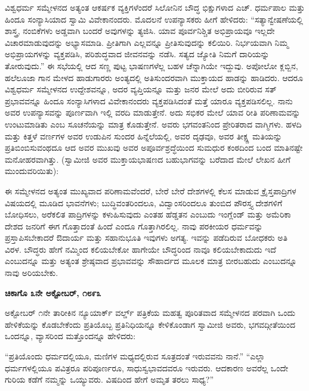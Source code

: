 ವಿಶ್ವಧರ್ಮ ಸಮ್ಮೇಳನದ ಅತ್ಯಂತ ಆಕರ್ಷಕ ವ್ಯಕ್ತಿಗಳೆಂದರೆ ಸಿಲೋನಿನ ಬೌದ್ಧ ಭಿಕ್ಷು\break ಗಳಾದ ಎಚ್​. ಧರ್ಮಪಾಲ ಮತ್ತು ಹಿಂದೂ ಸಂನ್ಯಾಸಿಯಾದ ಸ್ವಾಮಿ ವಿವೇಕಾನಂದರು. ಮೊದಲನೆ ಉಪನ್ಯಾಸಕರು ಹೀಗೆ ಹೇಳಿದರು: “ಸತ್ಯಾನ್ವೇಷಣೆಯಲ್ಲಿ ಶಾಸ್ತ್ರ, ನಂಬಿಕೆಗಳು ಅಡ್ಡವಾಗಿ ಬಂದರೆ ಅವುಗಳನ್ನು ತ್ಯಜಿಸಿ. ಯಾವ ಪೂರ್ವನಿಶ್ಚಿತ ಅಭಿಪ್ರಾಯವೂ ಇಲ್ಲದೇ ವಿಚಾರಮಾಡುವುದನ್ನು ಅಭ್ಯಾಸಮಾಡಿ. ಪ್ರೀತಿಗಾಗಿ ಎಲ್ಲವನ್ನೂ ಪ್ರೀತಿಸುವುದನ್ನು ಕಲಿ\break ಯಿರಿ. ನಿರ್ಭಯವಾಗಿ ನಿಮ್ಮ ಅಭಿಪ್ರಾಯಗಳನ್ನು ವ್ಯಕ್ತಪಡಿಸಿ, ಪರಿಶುದ್ಧವಾದ ಜೀವನವನ್ನು ನಡೆಸಿ. ಸತ್ಯದ ಜ್ಯೋತಿ ನಿಮಗೆ ದಾರಿಯನ್ನು ತೋರುವುದು.” ಈ ಸಭೆಯಲ್ಲಿ ಆದ ಸಣ್ಣ ಪುಟ್ಟ ಭಾಷಣಗಳೆಲ್ಲ ಬಹಳ ಚೆನ್ನಾಗಿಯೇ ಇದ್ದುವು. ಅಪೋಲೋ ಕ್ಲಬ್ಬಿನ, ಹಲೆಲೂಜಾ ಗಾನ ಮೇಳದ ಹಾಡುಗಾರರು ಅಂತ್ಯದಲ್ಲಿ ಅತಿಸುಂದರವಾಗಿ ಮುಕ್ತಾಯದ ಹಾಡನ್ನು ಹಾಡಿದರು. ಆದರೂ ವಿಶ್ವಧರ್ಮ ಸಮ್ಮೇಳನದ ಉದ್ದೇಶವನ್ನೂ, ಅದರ ವ್ಯಪ್ತಿಯನ್ನೂ ಮತ್ತು ಜನರ ಮೇಲೆ ಅದು ಬೀರಿರುವ ಸತ್​ಪ್ರಭಾವವನ್ನೂ ಹಿಂದೂ ಸಂನ್ಯಾಸಿಗಳಾದ ವಿವೇಕಾನಂದರು ವ್ಯಕ್ತಪಡಿಸಿದಂತೆ ಮತ್ತೆ ಯಾರೂ ವ್ಯಕ್ತಪಡಿಸಲಿಲ್ಲ. ನಾನು ಅವರ ಉಪನ್ಯಾಸವನ್ನು ಪೂರ್ಣವಾಗಿ ಇಲ್ಲಿ ವರದಿ ಮಾಡುತ್ತೇನೆ. ಅದು ಸಭಿಕರ ಮೇಲೆ ಯಾವ ರೀತಿ ಪರಿಣಾಮವನ್ನು ಉಂಟುಮಾಡಿತು ಎಂಬ ಸೂಚನೆಯನ್ನು ಮಾತ್ರ ಕೊಡುತ್ತೇನೆ. ಅವರು ಭಗವಂತನಿಂದ ಪ್ರೇರಿತರಾದ ವಾಗ್ಮಿಗಳು. ಹಳದಿ ಮತ್ತು ಕಿತ್ತಳೆ ವರ್ಣಗಳ ಅವರ ಉಡುಪಿನ ಸುಂದರ ಹಿನ್ನೆಲೆಯಲ್ಲಿ, ಅವರ ದೃಢವೂ, ಅವರ ತೀಕ್ಷ್ಣ ಮತಿಯನ್ನು ಪ್ರತಿಬಿಂಬಿಸುವಂಥದೂ ಆದ ಅವರ ಮುಖವು ಅವರ ಅಪೂರ್ವಶ್ರದ್ಧೆಯಿಂದ ಸುಮಧುರ ಕಂಠದಿಂದ ಬಂದ ಮಾತಿನಷ್ಟೇ ಮನೋಹರವಾಗಿತ್ತು. (ಸ್ವಾಮೀಜಿ ಅವರ ಮುಕ್ತಾಯಭಾಷಣದ ಬಹುಭಾಗವನ್ನು ಬರೆದಾದ ಮೇಲೆ ಲೇಖನ ಹೀಗೆ ಮುಂದುವರಿಯಿತು):

ಈ ಸಮ್ಮೇಳನದ ಅತ್ಯಂತ ಮುಖ್ಯವಾದ ಪರಿಣಾಮವೆಂದರೆ, ಬೇರೆ ಬೇರೆ ದೇಶಗಳಲ್ಲಿ ಕೆಲಸ ಮಾಡುವ ಕ್ರೈಸ್ತಪಾದ್ರಿಗಳ ವಿಷಯದಲ್ಲಿ ಮೂಡಿದ ಭಾವನೆಗಳು; ಬುದ್ಧಿವಂತ\break ರಿಂದಲೂ, ವಿದ್ವಾಂಸರಿಂದಲೂ ತುಂಬಿದ ಪೌರಸ್ತ್ಯ ದೇಶಗಳಿಗೆ ಬೋಧಿಸಲು, ಅರೆಕಲಿತ ಪಾದ್ರಿಗಳನ್ನು ಕಳುಹಿಸುವುದು ಎಂತಹ ಹೆಡ್ಡತನ ಎಂಬುದು ಇಂಗ್ಲೆಂಡ್​ ಮತ್ತು ಅಮೆರಿಕಾ ದೇಶದ ಜನರಿಗೆ ಈಗ ಗೊತ್ತಾದಂತೆ ಹಿಂದೆ ಎಂದೂ ಗೊತ್ತಾಗಿರಲಿಲ್ಲ. ನಾವು ಪರಕೀಯರ ಧರ್ಮವನ್ನು ಪ್ರಸ್ತಾಪಿಸಬೇಕಾದರೆ ಔದಾರ್ಯ ಮತ್ತು ಸಹಾನುಭೂತಿ ಇವುಗಳು ಅಗತ್ಯ. ಇವನ್ನು ಪಡೆದಿರುವ ಬೋಧಕರು ಅತಿ ವಿರಳ. ಬೌದ್ಧರು ಹೇಗೆ ನಮ್ಮಿಂದ ಕಲಿಯಬೇಕೋ ಹಾಗೇಯೇ ಬೌದ್ಧರಿಂದ ನಾವೂ ಕಲಿಯಬೇಕಾದುದು ಇದೆ ಎಂಬುದನ್ನೂ ಮತ್ತು ಅತ್ಯಂತ ಶ್ರೇಷ್ಠವಾದ ಪ್ರಭಾವವನ್ನು ಸೌಹಾರ್ದದ ಮೂಲಕ ಮಾತ್ರ ಬೀರಬಹುದು ಎಂಬುದನ್ನೂ ನಾವು ಅರಿಯಬೇಕು.

\delimiter

\textbf{ಚಿಕಾಗೊ ೩ನೇ ಅಕ್ಟೋಬರ್​, ೧೮೯೩} 

ಅಕ್ಟೋಬರ್​ ೧ನೇ ತಾರೀಕಿನ ನ್ಯೂಯಾರ್ಕ್​ ವರ್ಲ್ಡ್​ ಪತ್ರಿಕೆಯ ಮಹತ್ವ ಪೂರಿತವಾದ ಸಮ್ಮೇಳನದ ಪರವಾಗಿ ಒಂದು ಹೇಳಿಕೆಯನ್ನು ಕೊಡಬೇಕೆಂದು ಪ್ರತಿಯೊಬ್ಬ ಪ್ರತಿನಿಧಿ\break ಯನ್ನೂ ಕೇಳಿಕೊಂಡಾಗ ಸ್ವಾಮೀಜಿ ಅವರು, ಭಗವದ್ಗೀತೆಯಿಂದ ಒಂದನ್ನೂ, ವ್ಯಾಸರಿಂದ ಮತ್ತೊಂದನ್ನೂ ಹೇಳಿದರು:

“ಪ್ರತಿಯೊಂದು ಧರ್ಮದಲ್ಲಿಯೂ, ಮಣಿಗಳ ಮಧ್ಯದಲ್ಲಿರುವ ಸೂತ್ರದಂತೆ ಇರು\break ವವನು ನಾನೆ.” “ಎಲ್ಲಾ ಧರ್ಮಗಳಲ್ಲಿಯೂ ಪವಿತ್ರರೂ ಪರಿಪೂರ್ಣರೂ, ಸಾಧುಸ್ವಭಾವ\break ದವರೂ ಇರುವರು. ಆದಕಾರಣ ಅವರೆಲ್ಲ ಒಂದೇ ಗುರಿಯ ಕಡೆಗೆ ನಮ್ಮನ್ನು ಒಯ್ಯುವರು. ವಿಷದಿಂದ ಹೇಗೆ ಅಮೃತ ತರಲು ಸಾಧ್ಯ?”

